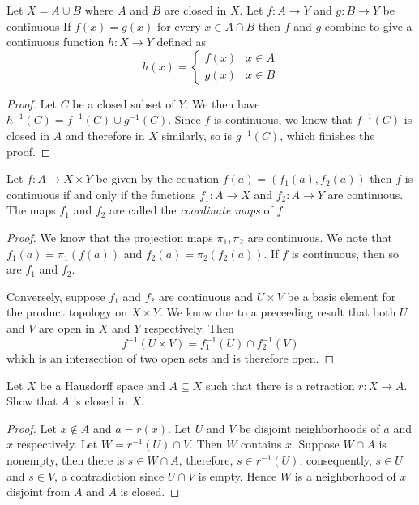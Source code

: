 \begin{lemma}
    Let $X = A\cup B$ where $A$ and $B$ are closed in $X$. Let $f:A\to Y$ and $g:B\to Y$ be continuous If $f(x) = g(x)$ for every $x\in A\cap B$ then $f$ and $g$ combine to give a continuous function $h:X\to Y$ defined as 
    \begin{equation*}
        h(x) =
        \begin{cases}
            f(x) & x\in A\\
            g(x) & x\in B
        \end{cases}
    \end{equation*}
\end{lemma}
\begin{proof}
    Let $C$ be a closed subset of $Y$. We then have $h^{-1}(C) = f^{-1}(C)\cup g^{-1}(C)$. Since $f$ is continuous, we know that $f^{-1}(C)$ is closed in $A$ and therefore in $X$ similarly, so is $g^{-1}(C)$, which finishes the proof.
\end{proof}

\begin{theorem}
    Let $f:A\to X\times Y$ be given by the equation $f(a) = (f_1(a), f_2(a))$ then $f$ is continuous if and only if the functions $f_1:A\to X$ and $f_2:A\to Y$ are continuous. The maps $f_1$ and $f_2$ are called the \textit{coordinate maps} of $f$.
\end{theorem}
\begin{proof}
    We know that the projection maps $\pi_1, \pi_2$ are continuous. We note that $f_1(a) = \pi_1(f(a))$ and $f_2(a) = \pi_2(f_2(a))$. If $f$ is continuous, then so are $f_1$ and $f_2$.

    Conversely, suppose $f_1$ and $f_2$ are continuous and $U\times V$ be a basis element for the product topology on $X\times Y$. We know due to a preceeding result that both $U$ and $V$ are open in $X$ and $Y$ respectively. Then 
    \begin{equation*}
        f^{-1}(U\times V) = f_1^{-1}(U)\cap f_2^{-1}(V)
    \end{equation*}
    which is an intersection of two open sets and is therefore open.
\end{proof}

\begin{example}
    Let $X$ be a Hausdorff space and $A\subseteq X$ such that there is a retraction $r: X\to A$. Show that $A$ is closed in $X$.
\end{example}
\begin{proof}
    Let $x\notin A$ and $a = r(x)$. Let $U$ and $V$ be disjoint neighborhoods of $a$ and $x$ respectively. Let $W = r^{-1}(U)\cap V$. Then $W$ contains $x$. Suppose $W\cap A$ is nonempty, then there is $s\in W\cap A$, therefore, $s\in r^{-1}(U)$, consequently, $s\in U$ and $s\in V$, a contradiction since $U\cap V$ is empty. Hence $W$ is a neighborhood of $x$ disjoint from $A$ and $A$ is closed.
\end{proof}

